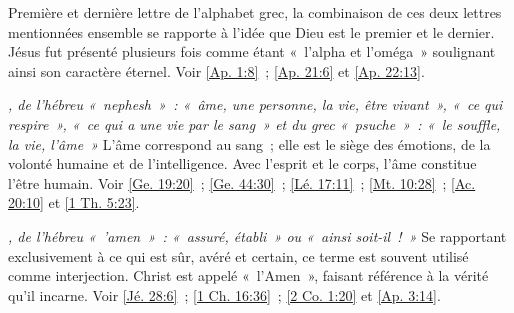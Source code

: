 \begin{multicols}{2}
\textit{}\newline
Première et dernière lettre de l'alphabet grec, la combinaison de ces deux lettres mentionnées ensemble se rapporte à l'idée que Dieu est le premier et le dernier. Jésus fut présenté plusieurs fois comme étant «~l'alpha et l'oméga~» soulignant ainsi son caractère éternel. Voir \vref{Ap. 1:8}~; \vref{Ap. 21:6} et \vref{Ap. 22:13}.

\textit{, de l'hébreu «~nephesh~»~: «~âme, une personne, la vie, être vivant~», «~ce qui respire~», «~ce qui a une vie par le sang~» et du grec «~psuche~»~: «~le souffle, la vie, l'âme~»}\newline
L'âme correspond au sang~; elle est le siège des émotions, de la volonté humaine et de l'intelligence. Avec l'esprit et le corps, l'âme constitue l'être humain. Voir \vref{Ge. 19:20}~; \vref{Ge. 44:30}~; \vref{Lé. 17:11}~; \vref{Mt. 10:28}~; \vref{Ac. 20:10} et \vref{1 Th. 5:23}.

\textit{, de l'hébreu «~'amen~»~: «~assuré, établi~» ou «~ainsi soit-il~!~»}\newline
Se rapportant exclusivement à ce qui est sûr, avéré et certain, ce terme est souvent utilisé comme interjection. Christ est appelé «~l'Amen~», faisant référence à la vérité qu'il incarne. Voir \vref{Jé. 28:6}~; \vref{1 Ch. 16:36}~; \vref{2 Co. 1:20} et \vref{Ap. 3:14}.


\end{multicols}
